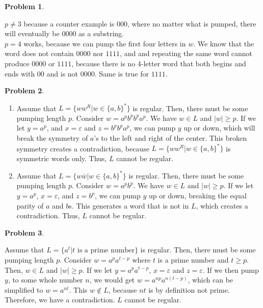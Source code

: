 \documentclass[11pt]{article}
\theoremstyle{definition}
\theoremstyle{case}
\theoremstyle{theorem}
\newtheorem{prob}{Problem}
\begin{document}
\begin{prob}\end{prob}

\noindent $p \neq 3$ because a counter example is $000$, where no matter what is pumped, there will eventually be $0000$ as a substring. \\
$p = 4$ works, because we can pump the first four letters in $w$. We know that the word does not contain $0000$ nor $1111$, and 
and repeating the same word cannot produce $0000$ or $1111$, because there is no 4-letter word that both begins and ends with 
$00$ and is not $0000$. Same is true for $1111$.


\newpage

\begin{prob}\end{prob}

\begin{enumerate}[label=(\alph*)]

\item
Assume that $L = \{ w w^R | w \in \{a, b\}^*\}$ is regular. Then, there must be some pumping length 
$p$. Consider $w = a^p b^p b^p a^p$. We have $w \in L$ and $|w| \geq p$. If we let $y = a^p$, 
and $x = \varepsilon$ and $z = b^p b^p a^p$, we can pump $y$ up or down, which will break the symmetry
of $a$'s to the left and right of the center. This broken symmetry creates a contradiction, because 
$L = \{ w w^R | w \in \{a, b\}^*\}$ is symmetric words only. Thus, $L$ cannot be regular.

\item
Assume that $L = \{ w \bar{w} | w \in \{a, b\}^*\}$ is regular. Then, there must be some pumping length
$p$. Consider $w = a^p b^p$. We have $w \in L$ and $|w| \geq p$. If we let $y = a^p$, $x = \varepsilon$,
and $z = b^p$, we can pump $y$ up or down, breaking the equal parity of $a$ and $b$s. This
generates a word that is not in $L$, which creates a contradiction. Thus, $L$ cannot be regular.

\end{enumerate} 

\begin{prob}\end{prob}

Assume that $L = \{ a^t | t \text{ is a prime number}\}$ is regular. Then, there must be some pumping length
$p$. Consider $w = a^p a^{t - p}$ where $t$ is a prime number and $t \geq p$. Then, $w \in L$ and 
$|w| \geq p$. If we let $y = a^p a^{t - p}$, $x = \varepsilon$ and $z = \varepsilon$. If we then pump $y$,
to some whole number $n$, we would get $w = a^{np} a^{n(t - p)}$, which can be simplified to $w = a^{nt}$. 
This $w \notin L$, because $nt$ is by definition not prime. Therefore, we have a contradiction. $L$ cannot be regular.
\end{document}
